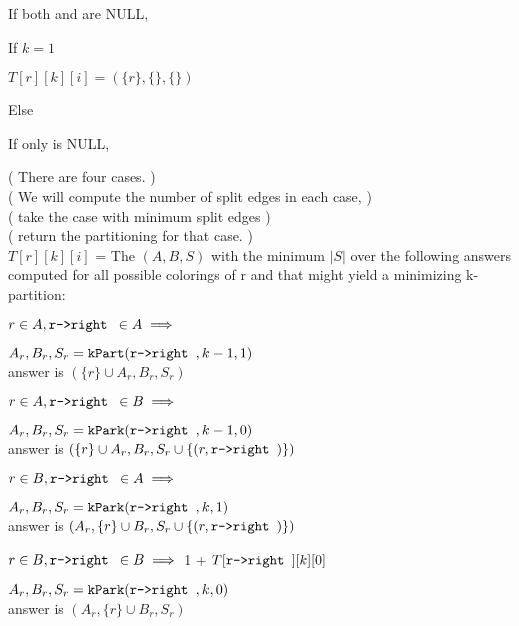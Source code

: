 \documentclass[11pt]{article}
\begin{document}
\begin{indentmore}
    If both \rleft and \rright are NULL,
        \begin{indentmore}
        If $k=1$
            \begin{indentmore}
            $T[r][k][i] = (\{r\}, \{\}, \{\})$
           \end{indentmore}
        Else
       \end{indentmore}
    If only \rleft is NULL,
        \begin{indentmore}
        ( There are four cases. )\\
        ( We will compute the number of split edges in each case, )\\
        ( take the case with minimum split edges )\\
        ( return the partitioning for that case. )\\
        $T[r][k][i]$ = The $(A,B,S)$ with the minimum $|S|$ over the following answers computed for all possible colorings of r and \rright that might yield a minimizing k-partition:\\
          \begin{indentmore}
          $r \in A, \texttt{r->right } \in A \implies $\\
            \begin{indentmore}
            $A_r, B_r, S_r = \mathtt{kPart}(\texttt{r->right },k-1,1)$\\
            answer is $(\{r\} \cup A_r, B_r, S_r)$\\
            \end{indentmore}
          $r \in A, \texttt{r->right } \in B \implies $\\
            \begin{indentmore}
            $A_r, B_r, S_r = \mathtt{kPark}(\texttt{r->right },k-1,0)$\\
            answer is $(\{r\} \cup A_r, B_r, S_r \cup \{(r, \texttt{r->right })\})$\\
           \end{indentmore}
          $r \in B, \texttt{r->right } \in A \implies $\\
            \begin{indentmore}
            $A_r, B_r, S_r = \mathtt{kPark}(\texttt{r->right },k,1)$\\
            answer is $(A_r,\{r\} \cup B_r, S_r \cup \{(r, \texttt{r->right })\})$\\
           \end{indentmore}
          $r \in B, \texttt{r->right } \in B \implies $ 1 + $T[\texttt{r->right }][k][0]$\\
            \begin{indentmore}
            $A_r, B_r, S_r = \mathtt{kPark}(\texttt{r->right },k,0)$\\
            answer is $(A_r,\{r\} \cup B_r, S_r)$
           \end{indentmore}
       \end{indentmore}


\end{indentmore}
\end{indentmore}
\end{document}
